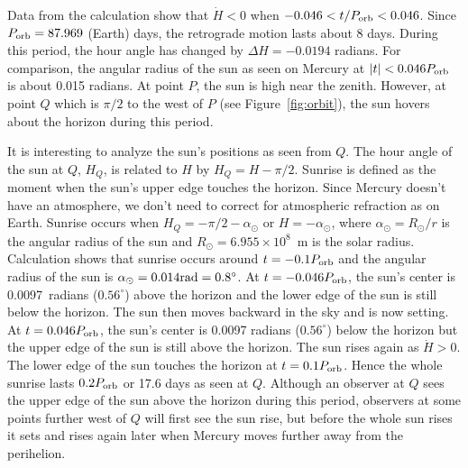 \documentclass[12pt]{article}
\newcommand{\porb}{P_{\rm orb}}
\begin{document}
Data from the calculation show that $\dot{H} < 0$ when 
$-0.046 < t/\porb < 0.046$. Since $\porb = 87.969$ (Earth) days, the retrograde 
motion lasts about 8 days. During this period, the hour angle has changed by 
$\Delta H = -0.0194$ radians. For comparison, the angular radius of the sun 
as seen on Mercury at $|t| < 0.046 \porb$ is about 0.015 radians. At point $P$, 
the sun is high near the zenith. However, at point $Q$ which is $\pi/2$ to 
the west of $P$ (see Figure~\ref{fig:orbit}), the sun hovers about the 
horizon during this period. 

It is interesting to analyze the sun's positions as seen from $Q$. 
The hour angle of the sun at $Q$, $H_Q$, is related to $H$ by 
$H_Q = H - \pi/2$. Sunrise is defined as the moment when the sun's 
upper edge touches the horizon. Since Mercury doesn't have an atmosphere, 
we don't need to correct for atmospheric refraction as on Earth. Sunrise 
occurs when $H_Q = -\pi/2 - \alpha_\odot$ or $H=-\alpha_\odot$, where 
$\alpha_\odot = R_\odot / r$ is the angular radius of the sun and 
$R_\odot = 6.955\times 10^8$~m is the solar radius. Calculation shows 
that sunrise occurs around $t=-0.1 \porb$ and the angular radius of the 
sun is $\alpha_\odot = 0.014 {\rm rad} = 0.8^\circ$. At $t=-0.046\porb$, 
the sun's center is 0.0097~radians ($0.56^\circ$) above the horizon and the 
lower edge of the sun is still below the horizon. The sun then moves 
backward in the sky and is now setting. At $t=0.046 \porb$, the sun's center 
is 0.0097 radians ($0.56^\circ$) below the horizon but the upper edge of the 
sun is still above the horizon. The sun rises again as $\dot{H}>0$. The lower 
edge of the sun touches the horizon at $t=0.1\porb$. Hence the whole sunrise 
lasts $0.2\porb$ or 17.6 days as seen at $Q$. Although an observer at $Q$ 
sees the upper edge of the sun above the horizon during this period, observers 
at some points further west of $Q$ will first see the sun rise, but 
before the whole sun rises it sets and 
rises again later when Mercury moves further away from the perihelion.
\end{document}
